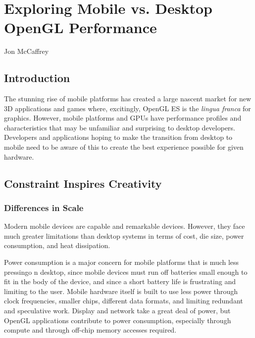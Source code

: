 \chapter{Exploring Mobile vs. Desktop OpenGL Performance}{Jon McCaffrey}
 \label{Exploring-Mobile-vs-Desktop-OpenGL-Performance}

\section{Introduction}

The stunning rise of mobile platforms has created a large nascent market for new 3D applications and games where, excitingly, OpenGL ES is the \textit{lingua franca} for graphics. However, mobile platforms and GPUs have performance profiles and characteristics that may be unfamiliar and surprising to desktop developers.  Developers and applications hoping to make the transition from desktop to mobile need to be aware of this to create the best experience possible for given hardware.

\section{Constraint Inspires Creativity}\label{Jon-McCaffrey:Constraints-Inspire-Creativity}

\subsection{Differences in Scale}\label{Jon-McCaffrey:Architectural-Differences}
Modern mobile devices are capable and remarkable devices.  However, they face much greater limitations than desktop systems in terms of cost, die size, power consumption, and heat dissipation.

Power consumption is a major concern for mobile platforms that is much less pressingo n desktop, since mobile devices must run off batteries small enough to fit in the body of the device, and since a short battery life is frustrating and limiting to the user.  Mobile hardware itself is built to use less power through clock frequencies, smaller chips, different data formats, and limiting redundant and speculative work.  Display and network take a great deal of power, but OpenGL applications contribute to power consumption, especially through compute and through off-chip memory accesses required.

